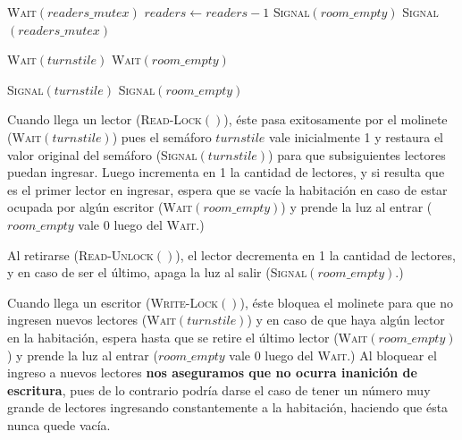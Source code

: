 \documentclass[a4paper,10pt,twoside]{article}
\newenvironment{pseudo}[1][]{%
    \vspace{0.5em}%
    \begin{algorithmic}%
}
{%
    \end{algorithmic}%
    \vspace{0.5em}%
}
\newcommand{\Fn}[2]{\textsc{#1}$(#2)$}
\begin{document}
\begin{pseudo}
        \State \Fn{Wait}{readers\_mutex}
        \State $readers \leftarrow readers - 1$ 
         
            \State \Fn{Signal}{room\_empty} 
        \EndIf
        \State \Fn{Signal}{readers\_mutex}
    \EndProcedure
\end{pseudo}

\begin{pseudo}
        \State \Fn{Wait}{turnstile} 
        \State \Fn{Wait}{room\_empty} 
    \EndProcedure
\end{pseudo}

\begin{pseudo}
        \State \Fn{Signal}{turnstile} 
        \State \Fn{Signal}{room\_empty} 
    \EndProcedure
\end{pseudo}

Cuando llega un lector (\Fn{Read-Lock}{}), éste pasa exitosamente por el molinete (\Fn{Wait}{turnstile}) pues el semáforo $turnstile$ vale inicialmente 1 y restaura el valor original del semáforo (\Fn{Signal}{turnstile}) para que subsiguientes lectores puedan ingresar. Luego incrementa en 1 la cantidad de lectores, y si resulta que es el primer lector en ingresar, espera que se vacíe la habitación en caso de estar ocupada por algún escritor (\Fn{Wait}{room\_empty}) y prende la luz al entrar ($room\_empty$ vale 0 luego del \textsc{Wait}.)

Al retirarse (\Fn{Read-Unlock}{}), el lector decrementa en 1 la cantidad de lectores, y en caso de ser el último, apaga la luz al salir (\Fn{Signal}{room\_empty}.)

Cuando llega un escritor (\Fn{Write-Lock}{}), éste bloquea el molinete para que no ingresen nuevos lectores (\Fn{Wait}{turnstile}) y en caso de que haya algún lector en la habitación, espera hasta que se retire el último lector (\Fn{Wait}{room\_empty}) y prende la luz al entrar ($room\_empty$ vale 0 luego del \textsc{Wait}.) Al bloquear el ingreso a nuevos lectores \textbf{nos aseguramos que no ocurra inanición de escritura}, pues de lo contrario podría darse el caso de tener un número muy grande de lectores ingresando constantemente a la habitación, haciendo que ésta nunca quede vacía.
\end{document}
